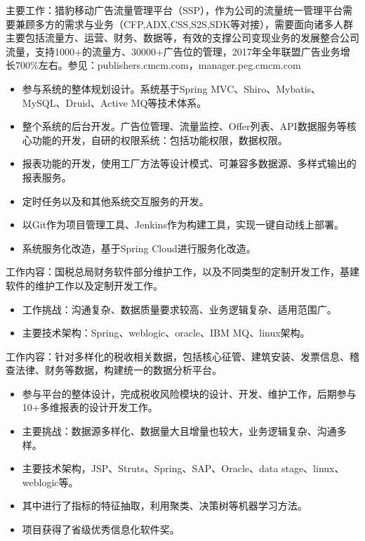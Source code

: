 \documentclass{resume}
\begin{document}
\begin{onehalfspacing}
主要工作：猎豹移动广告流量管理平台（SSP），作为公司的流量统一管理平台需要兼顾多方的需求与业务（CFP,ADX,CSS,S2S,SDK等对接），需要面向诸多人群主要包括流量方、运营、财务、数据等，有效的支撑公司变现业务的发展整合公司流量，支持1000+的流量方、30000+广告位的管理，2017年全年联盟广告业务增长700\%左右。参见：publishers.cmcm.com，manager.peg.cmcm.com
\begin{itemize}
  \item 参与系统的整体规划设计。系统基于Spring MVC、Shiro、Mybatis、MySQL、Druid、Active MQ等技术体系。
  \item 整个系统的后台开发。广告位管理、流量监控、Offer列表、API数据服务等核心功能的开发，自研的权限系统：包括功能权限，数据权限。
  \item 报表功能的开发，使用工厂方法等设计模式、可兼容多数据源、多样式输出的报表服务。
  \item 定时任务以及和其他系统交互服务的开发。
  \item 以Git作为项目管理工具、Jenkins作为构建工具，实现一键自动线上部署。
  \item 系统服务化改造，基于Spring Cloud进行服务化改造。 
\end{itemize}
\end{onehalfspacing}

\begin{onehalfspacing}
工作内容：国税总局财务软件部分维护工作，以及不同类型的定制开发工作，基建软件的维护工作以及定制开发工作。
\begin{itemize}
  \item 工作挑战：沟通复杂、数据质量要求较高、业务逻辑复杂、适用范围广。
  \item 主要技术架构：Spring、weblogic、oracle、IBM MQ、linux架构。
\end{itemize}
\end{onehalfspacing}

\begin{onehalfspacing}
工作内容：针对多样化的税收相关数据，包括核心征管、建筑安装、发票信息、稽查法律、财务等数据，构建统一的数据分析平台。
\begin{itemize}
  \item 参与平台的整体设计，完成税收风险模块的设计、开发、维护工作，后期参与10+多维报表的设计开发工作。
  \item 主要挑战：数据源多样化、数据量大且增量也较大，业务逻辑复杂、沟通多样。
  \item 主要技术架构，JSP、Struts、Spring、SAP、Oracle、data stage、linux、weblogic等。
  \item 其中进行了指标的特征抽取，利用聚类、决策树等机器学习方法。
  \item 项目获得了省级优秀信息化软件奖。
\end{itemize}
\end{onehalfspacing}
\end{document}
